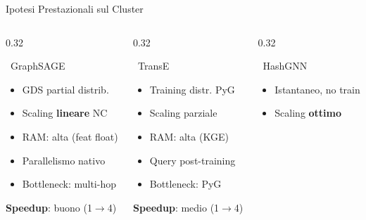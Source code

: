 \documentclass[aspectratio=169]{beamer}
\newcommand{\icoBrain}{\faBrain}
\newcommand{\icoCheck}{\faCheckCircle}
\newcommand{\icoX}{\faTimesCircle}
\newcommand{\icoBrain}{\ding{108}}
\newcommand{\icoCheck}{\ding{52}}
\newcommand{\icoX}{\ding{56}}
\newcommand{\pro}{{\color{successGreen}\icoCheck}}
\newcommand{\con}{{\color{warningRed}\icoX}}
\newcommand{\neu}{{\color{unigold}$\sim$}}
\begin{document}
\begin{frame}{Ipotesi Prestazionali sul Cluster}
  \begin{columns}[T]
    \begin{column}{0.32\textwidth}
      \begin{block}{\color{graphsageBlue}\icoBrain\ GraphSAGE}
        \footnotesize
        \begin{itemize}
          \setlength{\itemsep}{1pt}
          \item[\neu] GDS partial distrib.
          \item[\pro] Scaling \textbf{lineare} NC
          \item[\neu] RAM: alta (feat float)
          \item[\pro] Parallelismo nativo
          \item[\neu] Bottleneck: multi-hop
        \end{itemize}
        \vspace{4pt}
        {\scriptsize\textbf{Speedup}: buono (1$\to$4)}
      \end{block}
    \end{column}
    \begin{column}{0.32\textwidth}
      \begin{block}{\color{transeGreen}\icoBrain\ TransE}
        \footnotesize
        \begin{itemize}
          \setlength{\itemsep}{1pt}
          \item[\pro] Training distr. PyG
          \item[\neu] Scaling parziale
          \item[\neu] RAM: alta (KGE)
          \item[\neu] Query post-training
          \item[\con] Bottleneck: PyG
        \end{itemize}
        \vspace{4pt}
        {\scriptsize\textbf{Speedup}: medio (1$\to$4)}
      \end{block}
    \end{column}
    \begin{column}{0.32\textwidth}
      \begin{block}{\color{hashgnnPurple}\icoBrain\ HashGNN}
        \footnotesize
        \begin{itemize}
          \setlength{\itemsep}{1pt}
          \item[\pro] Istantaneo, no train
          \item[\pro] Scaling \textbf{ottimo}

\end{itemize}
\end{block}
\end{column}
\end{columns}
\end{frame}
\end{document}
